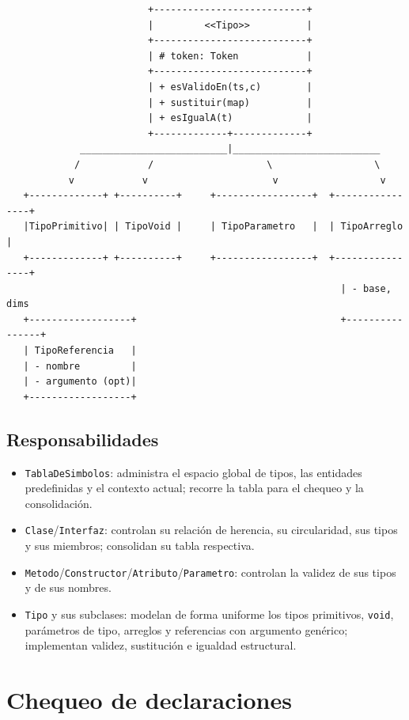 \documentclass[11pt,a4paper]{article}
\begin{document}
{\begin{verbatim}
                         +---------------------------+
                         |         <<Tipo>>          |
                         +---------------------------+
                         | # token: Token            |
                         +---------------------------+
                         | + esValidoEn(ts,c)        |
                         | + sustituir(map)          |
                         | + esIgualA(t)             |
                         +-------------+-------------+
             __________________________|__________________________
            /            /                    \                  \
           v            v                      v                  v
   +-------------+ +----------+     +-----------------+  +----------------+
   |TipoPrimitivo| | TipoVoid |     | TipoParametro   |  | TipoArreglo    |
   +-------------+ +----------+     +-----------------+  +----------------+
                                                           | - base, dims
   +------------------+                                    +----------------+
   | TipoReferencia   |
   | - nombre         |
   | - argumento (opt)|
   +------------------+
\end{verbatim}
}

\subsection{Responsabilidades}

\begin{itemize}
  \item \texttt{TablaDeSimbolos}: administra el espacio global de tipos, las
        entidades predefinidas y el contexto actual; recorre la tabla para el
        chequeo y la consolidación.
  \item \texttt{Clase}/\texttt{Interfaz}: controlan su relación de herencia, su
        circularidad, sus tipos y sus miembros; consolidan su tabla respectiva.
  \item \texttt{Metodo}/\texttt{Constructor}/\texttt{Atributo}/\texttt{Parametro}:
        controlan la validez de sus tipos y de sus nombres.
  \item \texttt{Tipo} y sus subclases: modelan de forma uniforme los tipos
        primitivos, \texttt{void}, parámetros de tipo, arreglos y referencias con
        argumento genérico; implementan validez, sustitución e igualdad estructural.
\end{itemize}

\section{Chequeo de declaraciones}
\end{document}
